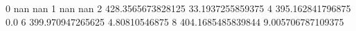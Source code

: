 0 nan nan
1 nan nan
2 428.3565673828125 33.1937255859375
4 395.162841796875 0.0
6 399.970947265625 4.80810546875
8 404.1685485839844 9.005706787109375
